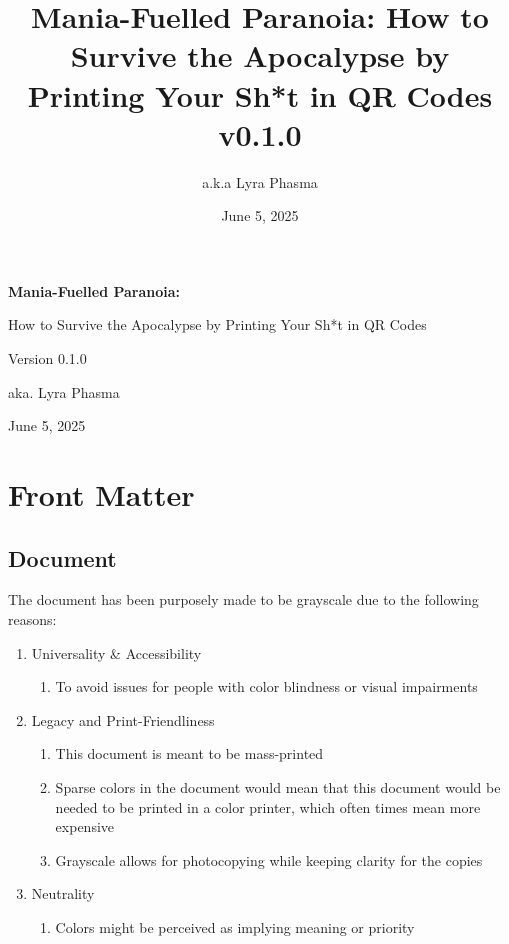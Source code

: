 \documentclass[a4paper,oneside,english]{book}
\title{Mania-Fuelled Paranoia: How to Survive the Apocalypse by Printing Your Sh*t in QR Codes v0.1.0}
\author{a.k.a Lyra Phasma}
\date{June 5, 2025}
\newcommand{\HUGETITLE}{\fontsize{4em}{5em}\selectfont\ManropeExtraBold}
\newcommand{\HUGE}{\fontsize{3em}{4em}\selectfont\ManropeExtraBold}
\begin{document}

\frontmatter

\begin{titlepage}
  \centering
  \vspace*{\fill}

  {\HUGETITLE\bfseries Mania-Fuelled Paranoia: \par}
  \vspace{0.25em}
  {\HUGE How to Survive the Apocalypse by Printing Your Sh*t in QR Codes \par}
  \vspace{1.5em}
  {\Huge Version 0.1.0\par}
  \vspace{2em}
  {\Huge aka. Lyra Phasma\par}
  \vspace{1em}
  {\Huge June 5, 2025\par}

  \vspace*{\fill}
\end{titlepage}

\tableofcontents

\mainmatter

\chapter{Front Matter}

\section{Document}

The document has been purposely made to be grayscale due to the following reasons:

\begin{enumerate}
  \item Universality \& Accessibility
    \begin{enumerate}[label=\alph*.]
      \item To avoid issues for people with color blindness or visual impairments
    \end{enumerate}
  \item Legacy and Print-Friendliness
    \begin{enumerate}[label=\alph*.]
      \item This document is meant to be mass-printed
      \item Sparse colors in the document would mean that this document would be needed to be printed in a color printer, which often times mean more expensive
      \item Grayscale allows for photocopying while keeping clarity for the copies
    \end{enumerate}
  \item Neutrality
    \begin{enumerate}[label=\alph*.]
      \item Colors might be perceived as implying meaning or priority
    \end{enumerate}
\end{enumerate}
\end{document}
